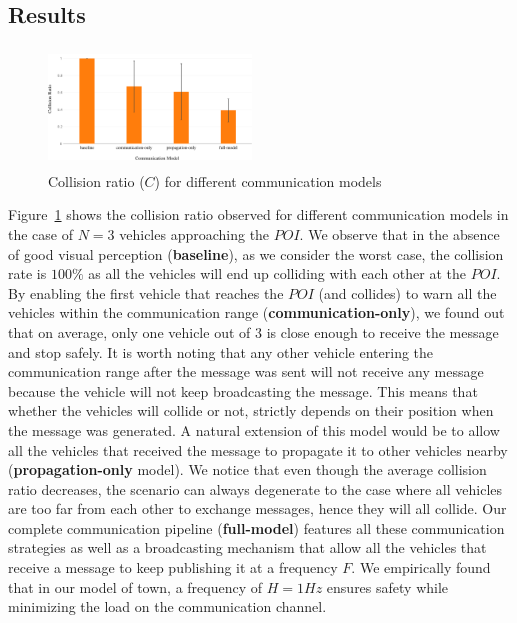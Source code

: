 \subsection{Results}

\begin{figure}[t]
    \centering
    \includegraphics[width=0.48\textwidth, height=120px]{figures/collision_ratio.pdf}
    \caption{Collision ratio ($C$) for different communication models \label{fig:collision_ratio}}
\end{figure}

Figure~\ref{fig:collision_ratio} shows the collision ratio observed for different communication models in the
case of $N=3$ vehicles approaching the $POI$. We observe that in the absence of good visual perception
(\textbf{baseline}), as we consider the worst case, the collision rate is $100\%$ as all the vehicles will end up 
colliding with each other at the $POI$. By enabling the first vehicle that reaches the $POI$ (and collides) to
warn all the vehicles within the communication range (\textbf{communication-only}), we found out that on 
average, only one vehicle out of $3$ is close enough to receive the message and stop safely. It is worth noting
that any other vehicle entering the communication range after the message was sent will not receive any message
because the vehicle will not keep broadcasting the message. This means that whether the vehicles will collide or 
not, strictly depends on their position when the message was generated. A natural extension of this model
would be to allow all the vehicles that received the message to propagate it to other vehicles nearby 
(\textbf{propagation-only} model). We notice that even though the average collision ratio decreases,
the scenario can always degenerate to the case where all vehicles are too far from each other to exchange 
messages, hence they will all collide. 
Our complete communication pipeline (\textbf{full-model}) features all these communication strategies as well
as a broadcasting mechanism that allow all the vehicles that receive a message to keep publishing it at a frequency 
$F$. We empirically found that in our model of town, a frequency of $H=1Hz$ ensures safety while minimizing 
the load on the communication channel.

